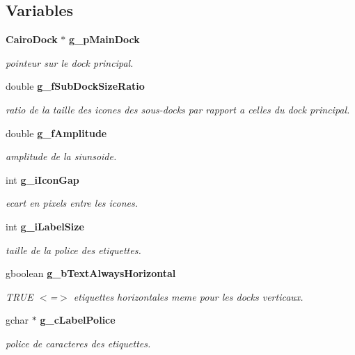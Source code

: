 \subsection*{Variables}
\begin{CompactItemize}
\item 
{\bf Cairo\-Dock} $\ast$ {\bf g\_\-p\-Main\-Dock}
\begin{CompactList}\small\item\em pointeur sur le dock principal. \item\end{CompactList}\item 
double {\bf g\_\-f\-Sub\-Dock\-Size\-Ratio}
\begin{CompactList}\small\item\em ratio de la taille des icones des sous-docks par rapport a celles du dock principal. \item\end{CompactList}\item 
double {\bf g\_\-f\-Amplitude}
\begin{CompactList}\small\item\em amplitude de la siunsoide. \item\end{CompactList}\item 
int {\bf g\_\-i\-Icon\-Gap}
\begin{CompactList}\small\item\em ecart en pixels entre les icones. \item\end{CompactList}\item 
int {\bf g\_\-i\-Label\-Size}
\begin{CompactList}\small\item\em taille de la police des etiquettes. \item\end{CompactList}\item 
gboolean {\bf g\_\-b\-Text\-Always\-Horizontal}
\begin{CompactList}\small\item\em TRUE $<$=$>$ etiquettes horizontales meme pour les docks verticaux. \item\end{CompactList}\item 
gchar $\ast$ {\bf g\_\-c\-Label\-Police}
\begin{CompactList}\small\item\em police de caracteres des etiquettes. \item\end{CompactList}\item 

\end{CompactItemize}
